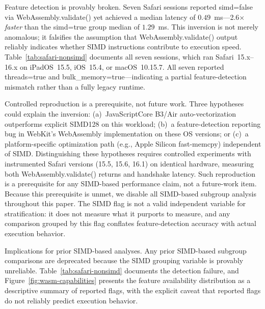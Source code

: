 \documentclass[11pt,a4paper]{article}
\def\textbf#1{#1}%
\def\texttt#1{#1}%
\begin{document}
\textbf{Feature detection is provably broken.} Seven Safari sessions reported \texttt{simd=false} via \texttt{WebAssembly.validate()} yet achieved a median latency of $0.49$~ms---2.6$\times$ \textit{faster} than the \texttt{simd=true} group median of $1.29$~ms. This inversion is not merely anomalous; it \textbf{falsifies} the assumption that \texttt{WebAssembly.validate()} output reliably indicates whether SIMD instructions contribute to execution speed. Table~\ref{tab:safari-nonsimd} documents all seven sessions, which ran Safari~15.x--16.x on iPadOS~15.5, iOS~15.4, or macOS~10.15.7. All seven reported \texttt{threads=true} and \texttt{bulk\_memory=true}---indicating a partial feature-detection mismatch rather than a fully legacy runtime.

\textbf{Controlled reproduction is a prerequisite, not future work.} Three hypotheses could explain the inversion: (a)~JavaScriptCore B3/Air auto-vectorization outperforms explicit SIMD128 on this workload; (b)~a feature-detection reporting bug in WebKit's WebAssembly implementation on these OS versions; or (c)~a platform-specific optimization path (e.g., Apple Silicon fast-memcpy) independent of SIMD. Distinguishing these hypotheses requires controlled experiments with instrumented Safari versions (15.5, 15.6, 16.1) on identical hardware, measuring both \texttt{WebAssembly.validate()} returns and handshake latency. \textbf{Such reproduction is a prerequisite for any SIMD-based performance claim, not a future-work item.} Because this prerequisite is unmet, we \textbf{disable all SIMD-based subgroup analysis} throughout this paper. The SIMD flag is not a valid independent variable for stratification: it does not measure what it purports to measure, and any comparison grouped by this flag conflates feature-detection accuracy with actual execution behavior.

\textbf{Implications for prior SIMD-based analyses.} Any prior SIMD-based subgroup comparisons are deprecated because the SIMD grouping variable is provably unreliable. Table~\ref{tab:safari-nonsimd} documents the detection failure, and Figure~\ref{fig:wasm-capabilities} presents the feature availability distribution as a descriptive summary of reported flags, with the explicit caveat that reported flags do not reliably predict execution behavior.
\end{document}
